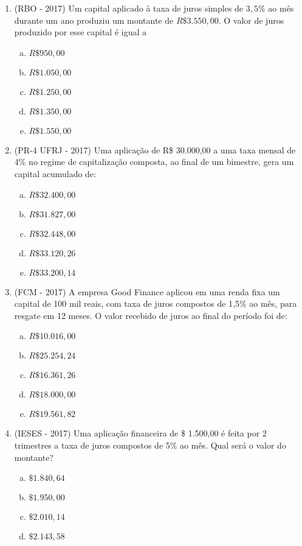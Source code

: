 \begin{enumerate}
  \item (RBO - 2017) Um capital aplicado à taxa de juros simples de $3,5\%$ ao mês durante um ano produziu um montante de $R\$ 3.550,00$. O valor de juros produzido por esse capital é igual a
  \begin{enumerate}[a)]
  \item $R\$ 950,00$
  \item $R\$ 1.050,00$
  \item $R\$ 1.250,00$
  \item $R\$ 1.350,00$
  \item $R\$ 1.550,00$
  \end{enumerate}

  \item (PR-4 UFRJ - 2017) Uma aplicação de R\$ 30.000,00 a uma taxa mensal de 4\% no regime de capitalização composta, ao final de um bimestre, gera um capital acumulado de:
  \begin{enumerate}[a)]
  \item $R\$ 32.400,00$
  \item $R\$ 31.827,00$
  \item $R\$ 32.448,00$
  \item $R\$ 33.120,26$
  \item $R\$ 33.200,14$
  \end{enumerate}

  \item (FCM - 2017) A empresa Good Finance aplicou em uma renda fixa um capital de 100 mil reais, com taxa de juros compostos de 1,5\% ao mês, para resgate em 12 meses. O valor recebido de juros ao final do período foi de:
  \begin{enumerate}[a)]
  \item $R\$ 10.016,00$
  \item $R\$ 25.254,24$
  \item $R\$ 16.361,26$
  \item $R\$ 18.000,00$
  \item $R\$ 19.561,82$
  \end{enumerate}

  \item (IESES - 2017) Uma aplicação financeira de \$ 1.500,00 é feita por 2 trimestres a taxa de juros compostos de 5\% ao mês. Qual será o valor do montante?
  \begin{enumerate}[a)]
  \item $\$ 1.840,64$
  \item $\$ 1.950,00$
  \item $\$ 2.010,14$
  \item $\$ 2.143,58$
  \end{enumerate}


\end{enumerate}
